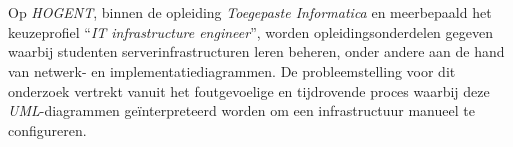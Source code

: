 
%
%
%
%
%

%



\chapter*{}


Op \emph{HOGENT}, binnen de opleiding \emph{Toegepaste Informatica} en meerbepaald het keuzeprofiel ``\emph{IT infrastructure engineer}'', worden opleidingsonderdelen gegeven waarbij studenten serverinfrastructuren leren beheren, onder andere aan de hand van netwerk- en implementatiediagrammen. De probleemstelling voor dit onderzoek vertrekt vanuit het foutgevoelige en tijdrovende proces waarbij deze \emph{UML}-diagrammen geïnterpreteerd worden om een infrastructuur manueel te configureren.


